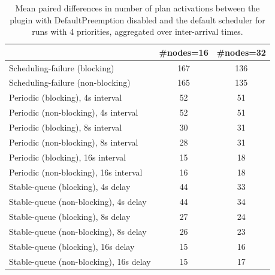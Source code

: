 \begin{table}[t]
\tiny
\setlength{\tabcolsep}{1.2pt}
\renewcommand{\arraystretch}{1.12}
\centering
\caption{Mean paired differences in number of plan activations between the plugin with DefaultPreemption disabled and the default scheduler for runs with 4 priorities, aggregated over inter-arrival times.}
\label{tab:plan_activations-defpreempt0-prio4-std0-agg-arrival}
\begin{tabular}{l c c}
\toprule
 & \#nodes=16 & \#nodes=32 \\
\midrule
Scheduling-failure (blocking) & 167 & 136 \\
Scheduling-failure (non-blocking) & 165 & 135 \\
Periodic (blocking), 4s interval & 52 & 51 \\
Periodic (non-blocking), 4s interval & 52 & 51 \\
Periodic (blocking), 8s interval & 30 & 31 \\
Periodic (non-blocking), 8s interval & 28 & 31 \\
Periodic (blocking), 16s interval & 15 & 18 \\
Periodic (non-blocking), 16s interval & 16 & 18 \\
Stable-queue (blocking), 4s delay & 44 & 33 \\
Stable-queue (non-blocking), 4s delay & 44 & 34 \\
Stable-queue (blocking), 8s delay & 27 & 24 \\
Stable-queue (non-blocking), 8s delay & 26 & 23 \\
Stable-queue (blocking), 16s delay & 15 & 16 \\
Stable-queue (non-blocking), 16s delay & 15 & 17 \\
\bottomrule
\end{tabular}
\end{table}
